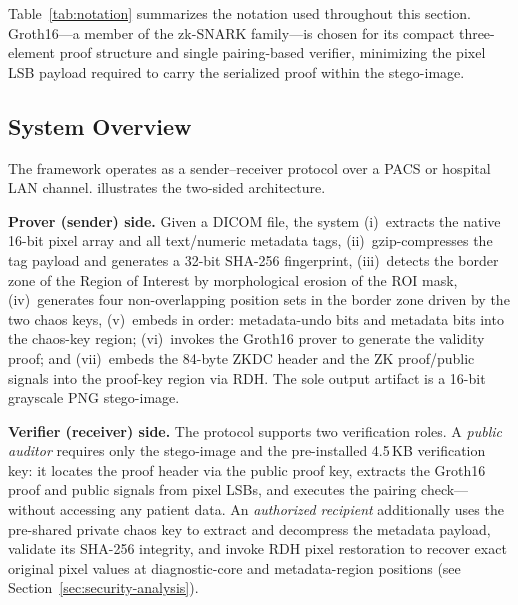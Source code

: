\documentclass{jstarticle}
\begin{document}
Table~\ref{tab:notation} summarizes the notation used throughout this section.
Groth16---a member of the zk-SNARK family---is chosen for its compact three-element proof structure and single pairing-based verifier, minimizing the pixel LSB payload required to carry the serialized proof within the stego-image.

\subsection{System Overview}

The framework operates as a sender--receiver protocol over a PACS or hospital LAN channel.
 illustrates the two-sided architecture.

\textbf{Prover (sender) side.}
Given a DICOM file, the system (i)~extracts the native 16-bit pixel array and all text/numeric metadata tags, (ii)~gzip-compresses the tag payload and generates a 32-bit SHA-256 fingerprint, (iii)~detects the border zone of the Region of Interest by morphological erosion of the ROI mask, (iv)~generates four non-overlapping position sets in the border zone driven by the two chaos keys, (v)~embeds in order: metadata-undo bits and metadata bits into the chaos-key region; (vi)~invokes the Groth16 prover to generate the validity proof; and (vii)~embeds the 84-byte ZKDC header and the ZK proof/public signals into the proof-key region via RDH.
The sole output artifact is a 16-bit grayscale PNG stego-image.

\textbf{Verifier (receiver) side.}
The protocol supports two verification roles.
A \emph{public auditor} requires only the stego-image and the pre-installed 4.5\,KB verification key: it locates the proof header via the public proof key, extracts the Groth16 proof and public signals from pixel LSBs, and executes the pairing check---without accessing any patient data.
An \emph{authorized recipient} additionally uses the pre-shared private chaos key to extract and decompress the metadata payload, validate its SHA-256 integrity, and invoke RDH pixel restoration to recover exact original pixel values at diagnostic-core and metadata-region positions (see Section~\ref{sec:security-analysis}).
\end{document}
